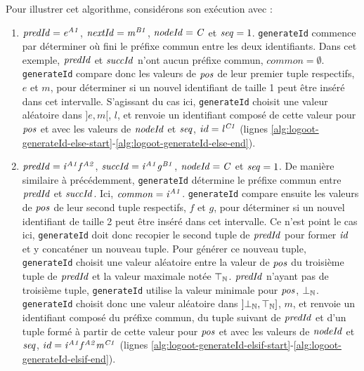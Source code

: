 Pour illustrer cet algorithme, considérons son exécution avec :
\begin{enumerate}
  \item $\mathit{predId} = \mathit{e}^{\mathit{A1}}_{\mathit{}}$, $\mathit{nextId} = \mathit{m}^{\mathit{B1}}_{\mathit{}}$, $\mathit{nodeId} = \mathit{C}$ et $\mathit{seq} = 1$.
    \texttt{generateId} commence par déterminer où fini le préfixe commun entre les deux identifiants.
    Dans cet exemple, $\mathit{predId}$ et $\mathit{succId}$ n'ont aucun préfixe commun, \ie $common = \emptyset$.
    \texttt{generateId} compare donc les valeurs de $\mathit{pos}$ de leur premier tuple respectifs, \ie $e$ et $m$, pour déterminer si un nouvel identifiant de taille 1 peut être inséré dans cet intervalle.
    S'agissant du cas ici, \texttt{generateId} choisit une valeur aléatoire dans $]e,m[$, \eg $l$, et renvoie un identifiant composé de cette valeur pour $\mathit{pos}$ et avec les valeurs de $\mathit{nodeId}$ et $\mathit{seq}$, \ie $id = \mathit{l}^{\mathit{C1}}_{\mathit{}}$ (lignes \ref{alg:logoot-generateId-else-start}-\ref{alg:logoot-generateId-else-end}).
  \item $\mathit{predId} = \mathit{i}^{\mathit{A1}}_{\mathit{}}\mathit{f}^{\mathit{A2}}_{\mathit{}}$, $\mathit{succId} = \mathit{i}^{\mathit{A1}}_{\mathit{}}\mathit{g}^{\mathit{B1}}_{\mathit{}}$, $\mathit{nodeId} = \mathit{C}$ et $\mathit{seq} = 1$.
    De manière similaire à précédemment, \texttt{generateId} détermine le préfixe commun entre $\mathit{predId}$ et $\mathit{succId}$.
    Ici, $\mathit{common} = \mathit{i}^{\mathit{A1}}_{\mathit{}}$.
    \texttt{generateId} compare ensuite les valeurs de $\mathit{pos}$ de leur second tuple respectifs, \ie $f$ et $g$, pour déterminer si un nouvel identifiant de taille 2 peut être inséré dans cet intervalle.
    Ce n'est point le cas ici, \texttt{generateId} doit donc recopier le second tuple de $\mathit{predId}$ pour former $\mathit{id}$ et y concaténer un nouveau tuple.
    Pour générer ce nouveau tuple, \texttt{generateId} choisit une valeur aléatoire entre la valeur de $\mathit{pos}$ du troisième tuple de $\mathit{predId}$ et la valeur maximale notée $\top_\mathbb{N}$.
    $\mathit{predId}$ n'ayant pas de troisième tuple, \texttt{generateId} utilise la valeur minimale pour $\mathit{pos}$, $\bot_\mathbb{N}$.
    \texttt{generateId} choisit donc une valeur aléatoire dans $]\bot_\mathbb{N},\top_\mathbb{N}]$\footnotemark, \eg $m$, et renvoie un identifiant composé du préfixe commun, du tuple suivant de $\mathit{predId}$ et d'un tuple formé à partir de cette valeur pour $\mathit{pos}$ et avec les valeurs de $\mathit{nodeId}$ et $\mathit{seq}$, \ie $id = \mathit{i}^{\mathit{A1}}_{\mathit{}}\mathit{f}^{\mathit{A2}}_{\mathit{}}\mathit{m}^{\mathit{C1}}_{\mathit{}}$ (lignes \ref{alg:logoot-generateId-elsif-start}-\ref{alg:logoot-generateId-elsif-end}).
\end{enumerate}


